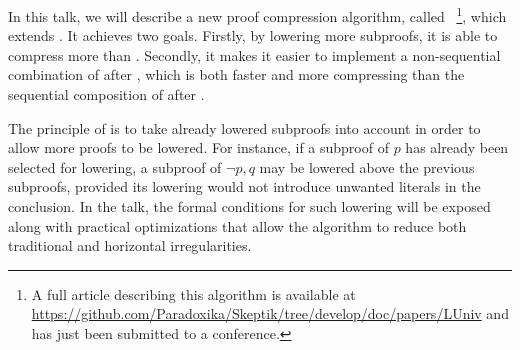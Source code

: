 \documentclass{easychair}
\begin{document}
In this talk, we will describe a new proof compression algorithm, called \LowerUnivalents~\footnote{A full article describing
this algorithm is available at \url{https://github.com/Paradoxika/Skeptik/tree/develop/doc/papers/LUniv} and has just been submitted to a conference.}, which extends \LowerUnits. It achieves two goals. Firstly, by lowering
more subproofs, it is able to compress more than \LowerUnits. Secondly, it makes it easier to implement a non-sequential combination of \LowerUnivalents after
\RecyclePivotsIntersection, which is both faster and more
compressing than the sequential composition of \LowerUnits after \RecyclePivotsIntersection.

The principle of \LowerUnivalents is to take already lowered subproofs into account in order to
allow more proofs to be lowered. For instance, if a subproof of $p$ has already been selected for
lowering, a subproof of $\neg p, q$ may be lowered above the previous subproofs, provided its
lowering would not introduce unwanted literals in the conclusion. In the talk, the formal conditions for such
lowering will be exposed along with practical optimizations that allow the algorithm to reduce both
traditional and horizontal irregularities.




\end{document}
